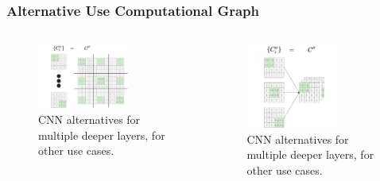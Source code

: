 \documentclass[aspectratio=169]{beamer}
\begin{document}
  \begin{frame}
    \frametitle{Alternative Use Computational Graph}
    \begin{columns}
      \begin{column}{0.5\textwidth}
        \begin{figure}[th!]
          \centering
          \includegraphics[width=0.7\textwidth]{alternative_computational_graph.pdf}
          \caption{CNN alternatives for multiple deeper layers, for other use cases. \autocite{repository}}
          \label{fig:alternative_computational_graph}
        \end{figure}
      \end{column}
      \begin{column}{0.5\textwidth}
        \begin{figure}[th!]
          \centering
          \includegraphics[width=0.7\textwidth]{alternative_computational_graph_2.pdf}
          \caption{CNN alternatives for multiple deeper layers, for other use cases. \autocite{repository}}
          \label{fig:alternative_computational_graph_2}
        \end{figure}
      \end{column}
    \end{columns}
  \end{frame}
\end{document}
